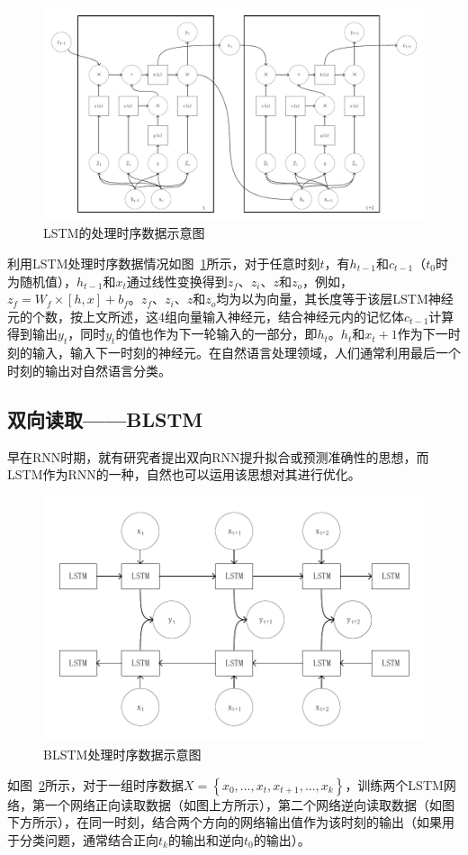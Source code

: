 \begin{figure}[htb]
	\centering
	\includegraphics[width=0.8\linewidth]{FIGs/chapter2/lstm_time.pdf}
	\caption{LSTM的处理时序数据示意图}\label{lstmtime}
\end{figure}

利用LSTM处理时序数据情况如图~\ref{lstmtime}所示，对于任意时刻$t$，有$h_{t-1}$和$c_{t-1}$（$t_0$时为随机值），$h_{t-1}$和$x_t$通过线性变换得到$z_f$、$z_i$、$z$和$z_o$，例如，$z_f=W_{f}\times [h,x]+b_{f}$。$z_f$、$z_i$、$z$和$z_o$均为以为向量，其长度等于该层LSTM神经元的个数，按上文所述，这4组向量输入神经元，结合神经元内的记忆体$c_{t-1}$计算得到输出$y_t$，同时$y_t$的值也作为下一轮输入的一部分，即$h_t$。$h_t$和$x_t+1$作为下一时刻的输入，输入下一时刻的神经元。在自然语言处理领域，人们通常利用最后一个时刻的输出对自然语言分类。\\

\subsection{双向读取——BLSTM}
早在RNN时期，就有研究者提出双向RNN提升拟合或预测准确性的思想，而LSTM作为RNN的一种，自然也可以运用该思想对其进行优化。

\begin{figure}[htb]
	\centering
	\includegraphics[width=0.8\linewidth]{FIGs/chapter2/blstm.pdf}
	\caption{BLSTM处理时序数据示意图}\label{blstm}
\end{figure}
如图~\ref{blstm}所示，对于一组时序数据$X=\left\{ x_0,\dots,x_t,x_{t+1},\dots,x_{k} \right\}$，训练两个LSTM网络，第一个网络正向读取数据（如图上方所示），第二个网络逆向读取数据（如图下方所示），在同一时刻，结合两个方向的网络输出值作为该时刻的输出（如果用于分类问题，通常结合正向$t_k$的输出和逆向$t_0$的输出）。


